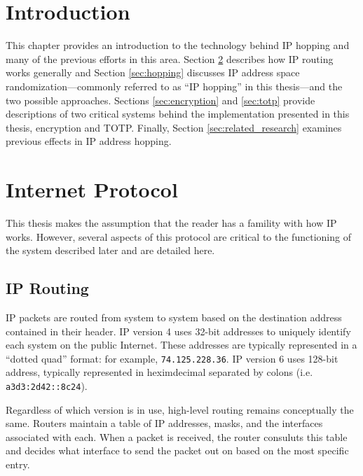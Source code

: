\label{chp:background}

\section{Introduction}
This chapter provides an introduction to the technology behind \ac{IP} hopping and many of the previous efforts in this area. Section \ref{sec:ip} describes how \ac{IP} routing works generally and Section \ref{sec:hopping} discusses IP address space randomization---commonly referred to as ``\ac{IP} hopping'' in this thesis---and the two possible approaches. Sections \ref{sec:encryption} and \ref{sec:totp} provide descriptions of two critical systems behind the implementation presented in this thesis, encryption and \ac{TOTP}. Finally, Section \ref{sec:related_research} examines previous effects in \ac{IP} address hopping.

\section{Internet Protocol}
\label{sec:ip}
\par This thesis makes the assumption that the reader has a famility with how \ac{IP} works. However, several aspects of this protocol are critical to the functioning of the system described later and are detailed here. 

\subsection{IP Routing}
\label{sec:routing}
\par IP packets are routed from system to system based on the destination address contained in their header. IP version 4 uses 32-bit addresses to uniquely identify each system on the public Internet. These addresses are typically represented in a ``dotted quad'' format: for example, \texttt{74.125.228.36}. IP version 6 uses 128-bit address, typically represented in heximdecimal separated by colons (i.e. \texttt{a3d3:2d42::8c24}).

\par Regardless of which version is in use, high-level routing remains conceptually the same. Routers maintain a table of \ac{IP} addresses, masks, and the interfaces associated with each. When a packet is received, the router consuluts this table and decides what interface to send the packet out on based on the most specific entry.  


